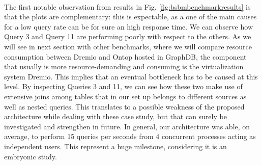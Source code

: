 \\
The first notable observation from results in Fig. \ref{fig:bsbmbenchmarkresults} is that the plots are complementary: this is expectable, as a one of the main causes for a low query rate can be for sure an high response time.
We can observe how Query 3 and Query 11 are performing poorly with respect to the others. As we will see in next section with other benchmarks, where we will compare resource consumption between Dremio and Ontop hosted in GraphDB, the component that usually is more resource-demanding and consuming is the virtualization system Dremio. This implies that an eventual bottleneck has to be caused at this level. By inspecting Queries 3 and 11, we can see how these two make use of extensive joins among tables that in our set up belongs to different sources as well as nested queries. This translates to a possible weakness of the proposed architecture while dealing with these case study, but that can surely be investigated and strengthen in future.
In general, our architecture was able, on average, to perform 15 queries per seconds from 4 concurrent processes acting as independent users. This represent a huge milestone, considering it is an embryonic study.



